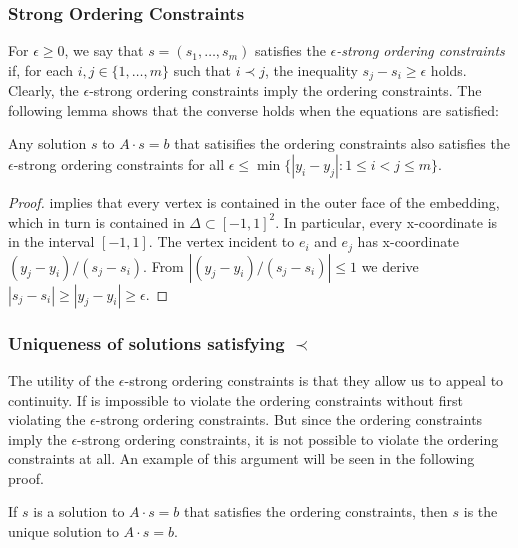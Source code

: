 \documentclass{patmorin}
\begin{document}
\subsubsection{Strong Ordering Constraints}
\label{strong}

For $\epsilon \ge 0$, we say that $s=(s_1,\ldots,s_m)$ satisfies
the \emph{$\epsilon$-strong ordering constraints} if, for each
$i,j\in\{1,\ldots,m\}$ such that $i\prec j$, the inequality
$s_j-s_i\ge \epsilon$ holds.
Clearly, the $\epsilon$-strong
ordering constraints imply the ordering constraints. The following lemma shows
that the converse holds when the equations are satisfied:

\begin{lem}
   Any solution $s$ to $A\cdot s=b$ that satisifies
the ordering constraints
 also satisfies 
   the $\epsilon$-strong ordering constraints
   for all $\epsilon\le\min\{|y_i-y_j| : 1\le i< j\le m\}$.
\end{lem}

\begin{proof}
    implies that every vertex is
contained in the outer face of the
   embedding, which in turn is contained in $\Delta\subset[-1,1]^2$.
In particular, every x-coordinate is
in the interval $[-1,1]$.
The vertex incident to $e_i$ and $e_j$ has x-coordinate
   $(y_j-y_i)/(s_j-s_i)$.
From $|(y_j-y_i)/(s_j-s_i)|\le 1$ we derive
   $|s_j-s_i|\ge|y_j-y_i| \ge \epsilon$.
\end{proof}

\subsubsection{Uniqueness of solutions satisfying $\prec$}

The utility of the $\epsilon$-strong ordering constraints is that they
allow us to appeal to continuity. If is impossible 
to violate
the ordering constraints without first violating the
 $\epsilon$-strong ordering constraints.
But since the ordering constraints imply the
 $\epsilon$-strong ordering constraints,
it is not possible
to violate
the ordering constraints at all.
An example of this argument will be seen in the following proof.

\begin{lem}
   If $s$ is a solution to $A\cdot s=b$ that satisfies the ordering
   constraints, %
then $s$ is 
   the unique solution to $A\cdot s=b$.
\end{lem}
\end{document}
